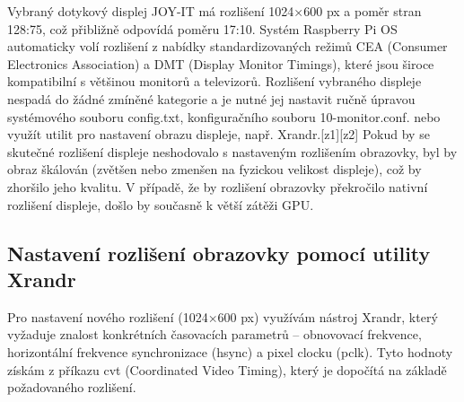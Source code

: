 Vybraný dotykový displej JOY-IT má rozlišení 1024×600 px a poměr stran 128:75, což přibližně odpovídá poměru 17:10. Systém Raspberry Pi OS automaticky volí rozlišení z nabídky standardizovaných režimů CEA (Consumer Electronics Association) a DMT (Display Monitor Timings), které jsou široce kompatibilní s většinou monitorů a televizorů. Rozlišení vybraného displeje nespadá do žádné zmíněné kategorie a je nutné jej nastavit ručně úpravou systémového souboru config.txt, konfiguračního souboru 10-monitor.conf. nebo využít utilit pro nastavení obrazu displeje, např. Xrandr.[z1][z2]
Pokud by se skutečné rozlišení displeje neshodovalo s nastaveným rozlišením obrazovky, byl by obraz škálován (zvětšen nebo zmenšen na fyzickou velikost displeje), což by zhoršilo jeho kvalitu. V případě, že by rozlišení obrazovky překročilo nativní rozlišení displeje, došlo by současně k větší zátěži GPU.

\subsection{Nastavení rozlišení obrazovky pomocí utility Xrandr}

Pro nastavení nového rozlišení (1024×600 px) využívám nástroj Xrandr, který vyžaduje znalost konkrétních časovacích parametrů – obnovovací frekvence, horizontální frekvence synchronizace (hsync) a pixel clocku (pclk). Tyto hodnoty získám z příkazu cvt (Coordinated Video Timing), který je dopočítá na základě požadovaného rozlišení.


